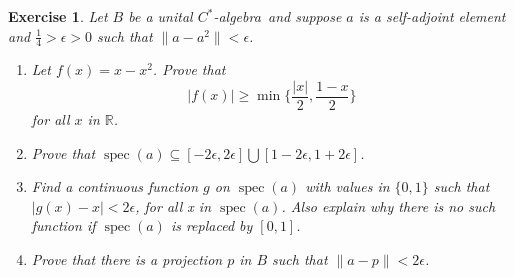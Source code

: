\documentclass{book}
\newtheorem{exercise}{Exercise}[section]
\def\cstar{\(C^*\)-algebra}
\begin{document}
\begin{exercise}
  Let \(B\) be a unital \cstar\ and suppose \(a\) is a self-adjoint
  element and \(\frac{1}{4}>\epsilon > 0\) such that \(\|a-a^2\| < \epsilon\).
  \begin{enumerate}
    \item Let \(f(x) = x-x^2\). Prove that
    \[
      |f(x)| \geq \min\{ \frac{|x|}{2},\frac{1-x}{2}\}
    \]
    for all \(x\) in \(\mathbb{R}\).
    \item Prove that \(\operatorname{spec}(a) \subseteq [-2 \epsilon,2\epsilon ] \bigcup  [1-2\epsilon ,1+2\epsilon ]\).
    \item Find a continuous function \(g\) on \(\operatorname{spec}(a)\) with values in \(\{0,1\}\) such that
    \(|g(x) -x| < 2\epsilon\), for all x in \(\operatorname{spec}(a)\). Also explain why there is no such
    function if \(\operatorname{spec}(a)\) is replaced by \([0,1]\).
    \item Prove that there is a projection \(p\) in \(B\) such that \(\|a-p\| < 2\epsilon\).
  \end{enumerate}
\end{exercise}
\end{document}
